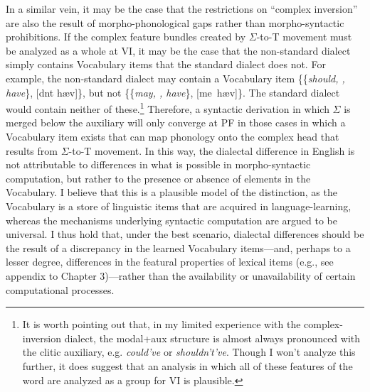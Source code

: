 In a similar vein, it may be the case that the restrictions on ``complex inversion'' are also the result of morpho-phonological gaps rather than morpho-syntactic prohibitions. If the complex feature bundles created by $\Sigma$-to-T movement must be analyzed as a whole at VI, it may be the case that the non-standard dialect simply contains Vocabulary items that the standard dialect does not. For example, the non-standard dialect may contain a Vocabulary item \{\{{\it should, \mbox{}, have}\}, [\textesh \textupsilon dnt h\ae v]\}, but not \{\{{\it may, \mbox{}, have}\}, [me\textsci\ h\ae v]\}. The standard dialect would contain neither of these.\footnote{It is worth pointing out that, in my limited experience with the complex-inversion dialect, the modal+aux structure is almost always pronounced with the clitic auxiliary, e.g. {\it could've} or {\it shouldn't've}. Though I won't analyze this further, it does suggest that an analysis in which all of these features of the word are analyzed as a group for VI is plausible.} Therefore, a syntactic derivation in which $\Sigma$ is merged below the auxiliary will only converge at PF in those cases in which a Vocabulary item exists that can map phonology onto the complex head that results from $\Sigma$-to-T movement. In this way, the dialectal difference in English is not attributable to differences in what is possible in morpho-syntactic computation, but rather to the presence or absence of elements in the Vocabulary. I believe that this is a plausible model of the distinction, as the Vocabulary is a store of linguistic items that are acquired in language-learning, whereas the mechanisms underlying syntactic computation are argued to be universal. I thus hold that, under the best scenario, dialectal differences should be the result of a discrepancy in the learned Vocabulary items---and, perhaps to a lesser degree, differences in the featural properties of lexical items (e.g., see appendix to Chapter 3)---rather than the availability or unavailability of certain computational processes. 

